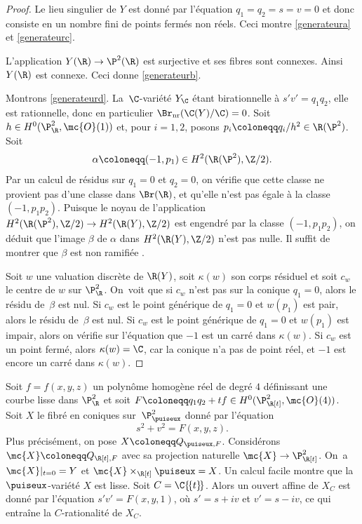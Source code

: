 \begin{proof}
Le lieu singulier de $Y$ est donné par l'équation $q_{1}=q_{2}=s=v=0$ et donc consiste en un nombre fini de points fermés non réels. Ceci montre \eqref{generateura} et \eqref{generateurc}.

L'application $Y(\R) \to \P^2(\R)$ est surjective et ses fibres
sont connexes. Ainsi $Y(\R)$ est connexe. Ceci donne \eqref{generateurb}.

Montrons \eqref{generateurd}. La~$\C$-variété $Y_\C$ étant birationnelle à $s'v'= q_1q_2$, elle est rationnelle, donc en particulier $\Br_{\mathrm{nr}}(\C(Y)/\C)=0$. Soit $h\in H^0(\P^2_\R,\mc{O}(1))$ et, pour $i=1,2$, posons $p_i\coloneqq q_i/h^2\in \R(\P^2)$. Soit \[\alpha\coloneqq (-1,p_1)\in H^2(\R(\P^2), \Z/2).\] Par un calcul de résidus sur $q_1=0$ et $q_2=0$, on vérifie que cette classe ne provient pas d'une classe dans $\Br(\R)$, et qu'elle n'est pas égale à la classe $(-1, p_1p_2)$.
Puisque le noyau de l'application $H^2(\R(\P^2), \Z/2)\to H^2(\R(Y), \Z/2)$ est engendré par la classe $(-1, p_1p_2)$, on déduit que l'image $\beta$ de $\alpha$ dans $H^2(\R(Y), \Z/2)$ n'est pas nulle. Il suffit de montrer que $\beta$ est non ramifiée \cite[Prop.\,4.2.3(a)]{colliot1995birational}.

Soit $w$ une valuation discrète de $\R(Y)$, soit $\kappa(w)$ son corps résiduel et soit $c_w$ le centre de $w$ sur $\P^2_\R$. On~voit que si $c_w$
n'est pas sur la conique $q_1=0$, alors le résidu de~$\beta$ est nul. Si $c_w$ est le point générique de $q_1=0$ et $w(p_{1})$ est pair, alors le résidu de~$\beta$ est nul.
Si $c_w$ est le point générique de $q_1=0$ et $w(p_{1})$ est impair, alors on vérifie sur l'équation que $-1$ est un carré dans $\kappa(w)$. Si $c_w$ est un point fermé, alors $\kappa(w)=\C$, car la conique n'a pas de point réel, et $-1$ est encore un carré dans $\kappa(w)$.
\end{proof}

Soit $f=f(x,y,z)$ un polynôme homogène réel de degré $4$ définissant une courbe lisse dans $\P^2_\R$ et soit $F\coloneqq q_1q_2+tf\in H^0(\P^2_{\R[t]},\mc{O}(4))$. Soit $X$ le fibré en coniques sur~$\P^2_{\puiseux}$ donné par l'équation
\[s^2+v^2=F(x,y,z).\]
Plus précisément, on pose $X\coloneqq Q_{\puiseux,F}$. Considérons $\mc{X}\coloneqq Q_{\R[t],F}$ avec sa projection naturelle $\mc{X}\to \P^2_{\R[t]}$. On~a $\mc{X}|_{t=0}=Y$ et $\mc{X}\times_{\R[t]}\puiseux=X$. Un calcul facile montre que la $\puiseux$-variété $X$ est lisse. Soit $C=\C\{\!\{t\}\!\}$. Alors un ouvert affine de $X_C$ est donné par l'équation $s'v'=F(x,y,1)$, où $s'=s+iv$ et $v'=s-iv$, ce qui entraîne la $C$-rationalité de $X_C$.

